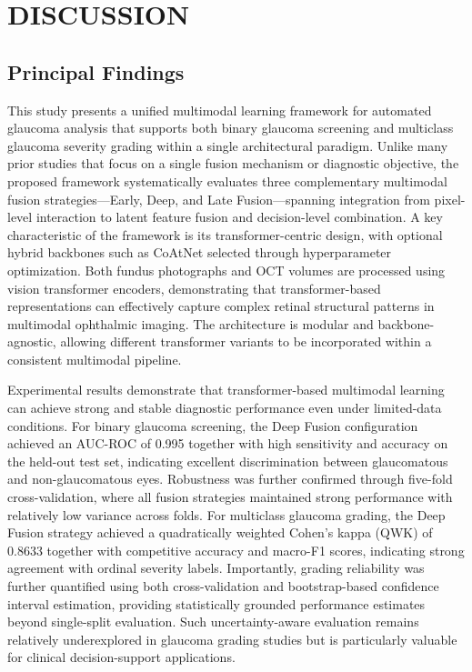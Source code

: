 \documentclass[preprint,12pt]{elsarticle}
\begin{document}
\section{DISCUSSION}

\subsection{Principal Findings}

This study presents a unified multimodal learning framework for automated glaucoma analysis that supports both binary glaucoma screening and multiclass glaucoma severity grading within a single architectural paradigm. Unlike many prior studies that focus on a single fusion mechanism or diagnostic objective, the proposed framework systematically evaluates three complementary multimodal fusion strategies—Early, Deep, and Late Fusion—spanning integration from pixel-level interaction to latent feature fusion and decision-level combination. A key characteristic of the framework is its transformer-centric design, with optional hybrid backbones such as CoAtNet selected through hyperparameter optimization. Both fundus photographs and OCT volumes are processed using vision transformer encoders, demonstrating that transformer-based representations can effectively capture complex retinal structural patterns in multimodal ophthalmic imaging. The architecture is modular and backbone-agnostic, allowing different transformer variants to be incorporated within a consistent multimodal pipeline.

Experimental results demonstrate that transformer-based multimodal learning can achieve strong and stable diagnostic performance even under limited-data conditions. For binary glaucoma screening, the Deep Fusion configuration achieved an AUC-ROC of 0.995 together with high sensitivity and accuracy on the held-out test set, indicating excellent discrimination between glaucomatous and non-glaucomatous eyes. Robustness was further confirmed through five-fold cross-validation, where all fusion strategies maintained strong performance with relatively low variance across folds. For multiclass glaucoma grading, the Deep Fusion strategy achieved a quadratically weighted Cohen’s kappa (QWK) of 0.8633 together with competitive accuracy and macro-F1 scores, indicating strong agreement with ordinal severity labels. Importantly, grading reliability was further quantified using both cross-validation and bootstrap-based confidence interval estimation, providing statistically grounded performance estimates beyond single-split evaluation. Such uncertainty-aware evaluation remains relatively underexplored in glaucoma grading studies but is particularly valuable for clinical decision-support applications.
\end{document}
